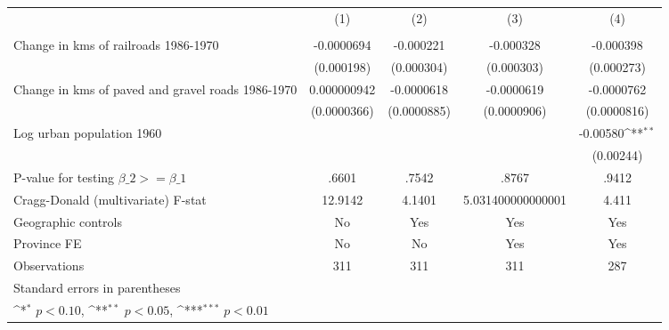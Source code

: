 {
\def\sym#1{\ifmmode^{#1}\else\(^{#1}\)\fi}
\begin{tabular}{l*{4}{c}}
\hline\hline
                &\multicolumn{1}{c}{(1)}&\multicolumn{1}{c}{(2)}&\multicolumn{1}{c}{(3)}&\multicolumn{1}{c}{(4)}\\
                &\multicolumn{1}{c}{}&\multicolumn{1}{c}{}&\multicolumn{1}{c}{}&\multicolumn{1}{c}{}\\
\hline
Change in kms of railroads 1986-1970&-0.0000694         &-0.000221         &-0.000328         &-0.000398         \\
                &(0.000198)         &(0.000304)         &(0.000303)         &(0.000273)         \\
[1em]
Change in kms of paved and gravel roads 1986-1970&0.000000942         &-0.0000618         &-0.0000619         &-0.0000762         \\
                &(0.0000366)         &(0.0000885)         &(0.0000906)         &(0.0000816)         \\
[1em]
Log urban population 1960&                  &                  &                  & -0.00580\sym{**} \\
                &                  &                  &                  &(0.00244)         \\
\hline
P-value for testing $\beta\_{2} >= \beta\_{1}$&    .6601         &    .7542         &    .8767         &    .9412         \\
Cragg-Donald (multivariate) F-stat&  12.9142         &   4.1401         &5.031400000000001         &    4.411         \\
Geographic controls&       No         &      Yes         &      Yes         &      Yes         \\
Province FE     &       No         &       No         &      Yes         &      Yes         \\
Observations    &      311         &      311         &      311         &      287         \\
\hline\hline
\multicolumn{5}{l}{\footnotesize Standard errors in parentheses}\\
\multicolumn{5}{l}{\footnotesize \sym{*} \(p<0.10\), \sym{**} \(p<0.05\), \sym{***} \(p<0.01\)}\\
\end{tabular}
}

